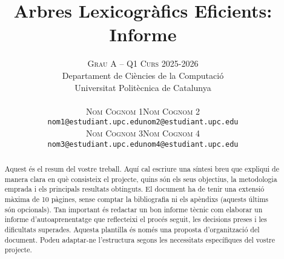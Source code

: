 \documentclass[a4paper]{article}
\title{\textbf{Arbres Lexicogràfics Eficients: Informe}}
\author{
\large
\textsc{Grau A -- Q1 Curs 2025-2026}\\[2mm] 
\normalsize Departament de Ciències de la Computació \\
\normalsize Universitat Politècnica de Catalunya \\[1cm]
%
\begin{tabular}{cc}
{\textsc{Nom Cognom 1}} & {\textsc{Nom Cognom 2}} \\
\normalsize \texttt{nom1@estudiant.upc.edu} & \normalsize \texttt{nom2@estudiant.upc.edu} \\[4mm]
{\textsc{Nom Cognom 3}} & {\textsc{Nom Cognom 4}} \\
\normalsize \texttt{nom3@estudiant.upc.edu} & \normalsize \texttt{nom4@estudiant.upc.edu} \\
\end{tabular}
}
\date{}
\begin{document}
\maketitle

\begin{abstract}
Aquest és el resum del vostre treball. Aquí cal escriure una síntesi breu que expliqui de manera clara en què consisteix el projecte, quins són els seus objectius, la metodologia emprada i els principals resultats obtinguts.
El document ha de tenir una extensió màxima de 10 pàgines, sense comptar la bibliografia ni els apèndixs (aquests últims són opcionals). Tan important és redactar un bon informe tècnic com elaborar un informe d’autoaprenentatge que reflecteixi el procés seguit, les decisions preses i les dificultats superades.
Aquesta plantilla és només una proposta d’organització del document. Podeu adaptar-ne l’estructura segons les necessitats específiques del vostre projecte.
\end{abstract}

 \newpage
 \newpage
 \newpage
\end{document}
